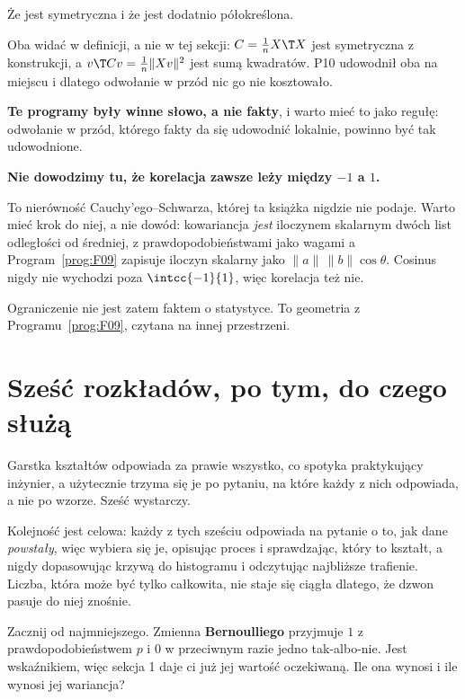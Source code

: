 \begin{fr}
\begin{ansblock}
Że jest symetryczna i że jest dodatnio półokreślona.
\end{ansblock}

Oba widać w definicji, a nie w tej sekcji: $C = \frac{1}{n}X\T X$ jest
symetryczna z konstrukcji, a $v\T C v = \frac{1}{n}\lVert Xv \rVert^{2}$ jest
sumą kwadratów. P10 udowodnił oba na miejscu i dlatego odwołanie w przód nic
go nie kosztowało.

\textbf{Te programy były winne słowo, a nie fakty}, i warto mieć to jako
regułę: odwołanie w przód, którego fakty da się udowodnić lokalnie, powinno
być tak udowodnione.
\end{fr}

\begin{fr}
\begin{rigourbox}
\textbf{Nie dowodzimy tu, że korelacja zawsze leży między $-1$ a $1$.}

To nierówność Cauchy'ego--Schwarza, której ta książka nigdzie nie podaje. Warto
mieć krok do niej, a nie dowód: kowariancja \emph{jest} iloczynem skalarnym
\dash{} dwóch list odległości od średniej, z prawdopodobieństwami jako wagami
\dash{} a Program~\ref{prog:F09} zapisuje iloczyn skalarny jako
$\lVert a \rVert\, \lVert b \rVert \cos\theta$. Cosinus nigdy nie wychodzi
poza $\intcc{-1}{1}$, więc korelacja też nie.

Ograniczenie nie jest zatem faktem o statystyce. To geometria z
Programu~\ref{prog:F09}, czytana na innej przestrzeni.
\end{rigourbox}

\end{fr}

\section{Sześć rozkładów, po tym, do czego służą}
\label{sec:P24-families}

\begin{fr}
Garstka kształtów odpowiada za prawie wszystko, co spotyka praktykujący
inżynier, a użytecznie trzyma się je po pytaniu, na które każdy z nich
odpowiada, a nie po wzorze. Sześć wystarczy.

Kolejność jest celowa: każdy z tych sześciu odpowiada na pytanie o to, jak dane
\emph{powstały}, więc wybiera się je, opisując proces i sprawdzając, który to
kształt, a nigdy dopasowując krzywą do histogramu i odczytując najbliższe
trafienie. Liczba, która może być tylko całkowita, nie staje się ciągła
dlatego, że dzwon pasuje do niej znośnie.

Zacznij od najmniejszego. Zmienna \textbf{Bernoulliego} przyjmuje $1$ z
prawdopodobieństwem $p$ i $0$ w przeciwnym razie \dash{} jedno tak-albo-nie.
Jest wskaźnikiem, więc sekcja 1 daje ci już jej wartość oczekiwaną. Ile ona
wynosi i ile wynosi jej wariancja?
\dotline
\nextframe
\end{fr}

